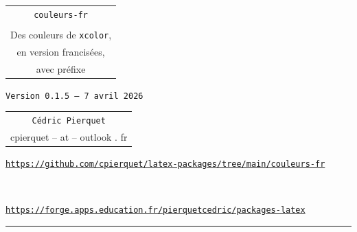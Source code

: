 \documentclass[french,11pt,a4paper]{article}
\def\TPversion{0.1.5}
\def\TPdate{7 avril 2026}
\begin{document}
\pagestyle{fancy}

\thispagestyle{empty}

\begin{center}
	\begin{minipage}{0.75\linewidth}
	\begin{tcolorbox}[colframe=yellow,colback=yellow!15]
		\begin{center}
			\begin{tabular}{c}
				{\Huge \texttt{couleurs-fr}}\\
				\\
				{\LARGE Des couleurs de \texttt{xcolor},} \\
				{\LARGE en version francisées,} \\
				{\LARGE avec préfixe}
			\end{tabular}

			\medskip

			{\small \texttt{Version \TPversion{} -- \TPdate}}
		\end{center}
	\end{tcolorbox}
\end{minipage}
\end{center}

\begin{center}
	\begin{tabular}{c}
		\texttt{Cédric Pierquet}\\
		{\ttfamily cpierquet -- at -- outlook . fr}
	\end{tabular}
\end{center}

\begin{center}
	\begin{minipage}{0.85\linewidth}
		\begin{tcolorbox}[colframe=teal,colback=teal!10,halign=center,fontupper=\footnotesize]
			\texttt{\url{https://github.com/cpierquet/latex-packages/tree/main/couleurs-fr}}

			~

			\texttt{\url{https://forge.apps.education.fr/pierquetcedric/packages-latex}}
		\end{tcolorbox}
	\end{minipage}
\end{center}

\hrule

\vspace*{5mm}

\end{document}
